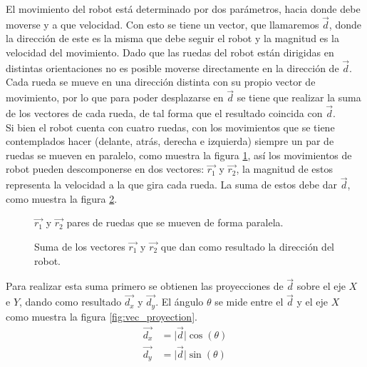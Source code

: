 \documentclass{iccmemoria}
\begin{document}
El movimiento del robot está determinado por dos parámetros, hacia donde debe moverse y a que velocidad. Con esto se tiene un vector, que llamaremos $\vec{d}$, donde la dirección de este es la misma que debe seguir el robot y la magnitud es la velocidad del movimiento. Dado que las ruedas del robot están dirigidas en distintas orientaciones no es posible moverse directamente en la dirección de $\vec{d}$. Cada rueda se mueve en una dirección distinta con su propio vector de movimiento, por lo que para poder desplazarse en $\vec{d}$ se tiene que realizar la suma de los vectores de cada rueda, de tal forma que el resultado coincida con $\vec{d}$.\\

Si bien el robot cuenta con cuatro ruedas, con los movimientos que se tiene contemplados hacer (delante, atrás, derecha e izquierda) siempre un par de ruedas se mueven en paralelo, como muestra la figura \ref{fig:omni_vector}, así los movimientos de robot pueden descomponerse en dos vectores: $\vec{r_{1}}$ y $\vec{r_{2}}$, la magnitud de estos representa la velocidad a la que gira cada rueda. La suma de estos debe dar $\vec{d}$, como muestra la figura \ref{fig:vec_sum}.\\

\begin{figure}[H]
  \centering
  \begin{large}
  
  \end{large}
  \caption{$\vec{r_{1}}$ y $\vec{r_{2}}$ pares de ruedas que se mueven de forma paralela.}
  \label{fig:omni_vector}
\end{figure}

\begin{figure}[H]
  \centering
  \begin{large}
  
  \end{large}
  \caption{Suma de los vectores $\vec{r_{1}}$ y $\vec{r_{2}}$ que dan como resultado la dirección del robot.}
  \label{fig:vec_sum}
\end{figure}

Para realizar esta suma primero se obtienen las proyecciones de $\vec{d}$ sobre el eje $X$ e $Y$, dando como resultado $\vec{d_{x}}$ y $\vec{d_{y}}$. El ángulo $\theta$ se mide entre el $\vec{d}$ y el eje $X$ como muestra la figura \ref{fig:vec_proyection}.\\

\begin{equation}
	\begin{split}
	\vec{d_{x}} & = \lvert \vec{d} \rvert \cos(\theta)\\
	\vec{d_{y}} & = \lvert \vec{d} \rvert \sin(\theta)\\
	\end{split}
\end{equation}
\end{document}
